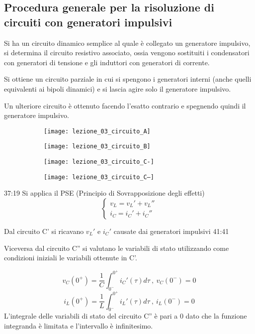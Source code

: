 \subsection{Procedura generale per la risoluzione di circuiti con generatori impulsivi}
Si ha un circuito dinamico semplice al quale è collegato un generatore impulsivo,
si determina il circuito resistivo associato, ossia vengono sostituiti i condensatori con 
generatori di tensione e gli induttori con generatori di corrente.

Si ottiene un circuito parziale in cui si spengono i generatori interni (anche quelli equivalenti ai bipoli dinamici) e si lascia agire solo il generatore impulsivo.

Un ulteriore circuito è ottenuto facendo l'esatto contrario e spegnendo quindi il generatore impulsivo.

\begin{figure}[H]\centering
\begin{subfigure}{0.45\linewidth}\centering
\texttt{[image: lezione\_03\_circuito\_A]}
\end{subfigure}
\begin{subfigure}{0.45\linewidth}\centering
\texttt{[image: lezione\_03\_circuito\_B]}
\end{subfigure}
\begin{subfigure}{0.45\linewidth}\centering
\texttt{[image: lezione\_03\_circuito\_C-]}
\end{subfigure}
\begin{subfigure}{0.4\linewidth}\centering
\texttt{[image: lezione\_03\_circuito\_C--]}
\end{subfigure}
\end{figure}
37:19
Si applica il PSE (Principio di Sovrapposizione degli effetti)
$$
\begin{cases}
v_L = v_L' + v_L''\\
i_C = i_C' + i_C''
\end{cases}
$$

Dal circuito C' si ricavano $v_L'$ e $i_C'$ causate dai generatori impulsivi 41:41

Viceversa dal circuito C'' si valutano le variabili di stato utilizzando come condizioni iniziali
le variabili ottenute in C'.

$$
v_C(0^+) = \frac{1}{C} \int_{0^-}^{0^+} i_C'(\tau)d\tau \ , \ v_C(0^-) = 0
$$
$$
i_L(0^+) = \frac{1}{L} \int_{0^-}^{0^+} i_L'(\tau)d\tau \ , \ i_L(0^-) = 0
$$
L'integrale delle variabili di stato del circuito C'' è pari a 0 dato che la funzione integranda è limitata
e l'intervallo è infinitesimo.

